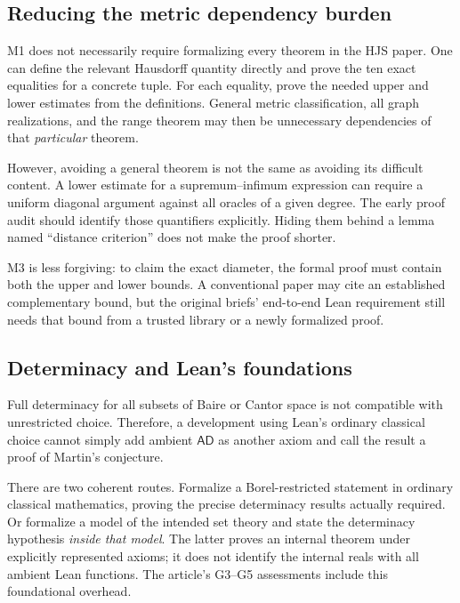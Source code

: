 \documentclass[11pt,a4paper]{article}
\theoremstyle{definition}\newtheorem{definition}[theorem]{Definition}
\theoremstyle{remark}\newtheorem{remark}[theorem]{Remark}
\begin{document}
\subsection{Reducing the metric dependency burden}

M1 does not necessarily require formalizing every theorem in the HJS paper. One can define the relevant Hausdorff quantity directly and prove the ten exact equalities for a concrete tuple. For each equality, prove the needed upper and lower estimates from the definitions. General metric classification, all graph realizations, and the range theorem may then be unnecessary dependencies of that \emph{particular} theorem.

However, avoiding a general theorem is not the same as avoiding its difficult content. A lower estimate for a supremum--infimum expression can require a uniform diagonal argument against all oracles of a given degree. The early proof audit should identify those quantifiers explicitly. Hiding them behind a lemma named ``distance criterion'' does not make the proof shorter.

M3 is less forgiving: to claim the exact diameter, the formal proof must contain both the upper and lower bounds. A conventional paper may cite an established complementary bound, but the original briefs' end-to-end Lean requirement still needs that bound from a trusted library or a newly formalized proof.

\subsection{Determinacy and Lean's foundations}
\label{sec:foundations}

Full determinacy for all subsets of Baire or Cantor space is not compatible with unrestricted choice. Therefore, a development using Lean's ordinary classical choice cannot simply add ambient $\mathsf{AD}$ as another axiom and call the result a proof of Martin's conjecture.

There are two coherent routes. Formalize a Borel-restricted statement in ordinary classical mathematics, proving the precise determinacy results actually required. Or formalize a model of the intended set theory and state the determinacy hypothesis \emph{inside that model}. The latter proves an internal theorem under explicitly represented axioms; it does not identify the internal reals with all ambient Lean functions. The article's G3--G5 assessments include this foundational overhead.\cite{MSS,LS}
\end{document}
